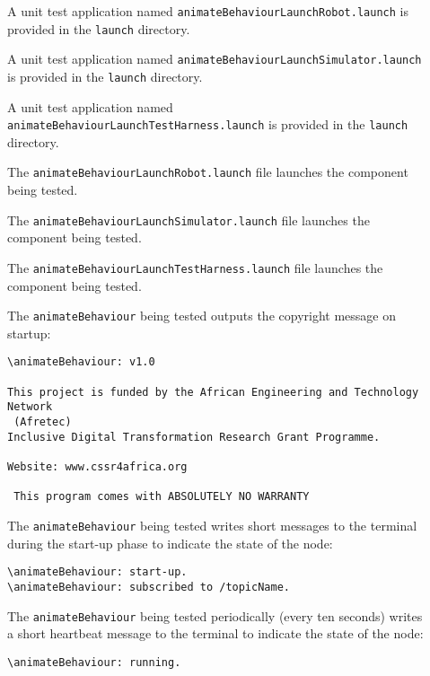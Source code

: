 \documentclass{CSSRforAfrica}
\newcommand{\checkboxChecked}{\fbox{\ding{51}}} %
\newcommand{\checkboxDashed}{\fbox{--}}         %
\begin{document}
\begin{description}
\item[\checkboxChecked] A unit test application named {\small \verb+animateBehaviourLaunchRobot.launch+} is provided in the {\small \verb+launch+} directory. 

\item[\checkboxChecked] A unit test application named {\small \verb+animateBehaviourLaunchSimulator.launch+} is provided in the {\small \verb+launch+} directory. 

\item[\checkboxChecked] A unit test application named {\small \verb+animateBehaviourLaunchTestHarness.launch+} is provided in the {\small \verb+launch+} directory. 

\item[\checkboxChecked] The {\small \verb+animateBehaviourLaunchRobot.launch+} file  launches the component being tested.

\item[\checkboxDashed] The {\small \verb+animateBehaviourLaunchSimulator.launch+} file  launches the component being tested.

\item[\checkboxChecked] The {\small \verb+animateBehaviourLaunchTestHarness.launch+} file  launches the component being tested.

\item[\checkboxChecked]  The {\small \verb+animateBehaviour+} being tested outputs the copyright message on startup:
\begin{verbatim}
\animateBehaviour: v1.0
 
This project is funded by the African Engineering and Technology Network 
 (Afretec) 
Inclusive Digital Transformation Research Grant Programme.
 
Website: www.cssr4africa.org
 
 This program comes with ABSOLUTELY NO WARRANTY
\end{verbatim}

\item[\checkboxChecked]  The {\small \verb+animateBehaviour+} being tested writes short messages to the terminal during the start-up phase to
 indicate the state of the node:
\begin{verbatim}
\animateBehaviour: start-up.
\animateBehaviour: subscribed to /topicName.
\end{verbatim}

\item[\checkboxChecked]  The {\small \verb+animateBehaviour+} being tested periodically (every ten seconds) writes a short heartbeat message to
 the terminal to indicate the state of the node:
\begin{verbatim}
\animateBehaviour: running.
\end{verbatim}


\end{description}
\end{document}
